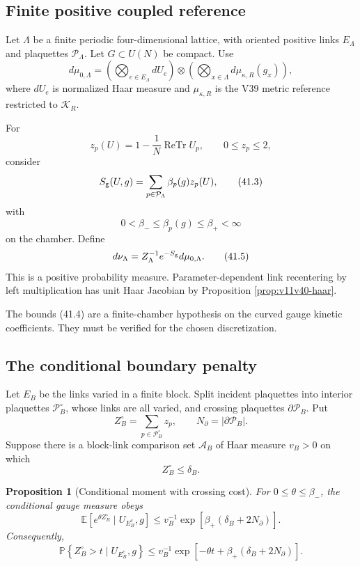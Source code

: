 \documentclass[11pt]{article}
\newtheorem{proposition}[theorem]{Proposition}
\begin{document}
\subsection{Finite positive coupled reference}

Let \(\Lambda\) be a finite periodic four-dimensional lattice, with
oriented positive links \(E_\Lambda\) and plaquettes
\(\mathcal P_\Lambda\).  Let \(G\subset U(N)\) be compact.  Use
\[
 d\mu_{0,\Lambda}
 =
 \left(\bigotimes_{e\in E_\Lambda}dU_e\right)
 \otimes
 \left(\bigotimes_{x\in\Lambda}d\mu_{\kappa,R}(g_x)\right),
 \tag{41.1}
\]
where \(dU_e\) is normalized Haar measure and
\(\mu_{\kappa,R}\) is the V39 metric reference restricted to
\(\mathcal K_R\).

For
\[
 z_p(U)=1-\frac1N\operatorname{ReTr}U_p,
 \qquad 0\leq z_p\leq2,
 \tag{41.2}
\]
consider
\[
 S_{\rm g}(U,g)
 =
 \sum_{p\in\mathcal P_\Lambda}\beta_p(g)z_p(U),
 \tag{41.3}
\]
with
\[
 0<\beta_-\leq\beta_p(g)\leq\beta_+<\infty
 \tag{41.4}
\]
on the chamber.  Define
\[
 d\nu_\Lambda
 =
 Z_\Lambda^{-1}e^{-S_{\rm g}}d\mu_{0,\Lambda}.
 \tag{41.5}
\]
This is a positive probability measure.  Parameter-dependent link
recentering by left multiplication has unit Haar Jacobian by
Proposition \ref{prop:v11v40-haar}.

The bounds (41.4) are a finite-chamber hypothesis on the curved gauge
kinetic coefficients.  They must be verified for the chosen
discretization.

\subsection{The conditional boundary penalty}

Let \(E_B\) be the links varied in a finite block.  Split incident
plaquettes into interior plaquettes \(\mathcal P_B^\circ\), whose links
are all varied, and crossing plaquettes
\(\partial\mathcal P_B\).  Put
\[
 Z_B^\circ=\sum_{p\in\mathcal P_B^\circ}z_p,
 \qquad
 N_\partial=|\partial\mathcal P_B|.
 \tag{41.6}
\]
Suppose there is a block-link comparison set \(\mathcal A_B\) of Haar
measure \(v_B>0\) on which
\[
 Z_B^\circ\leq\delta_B.
 \tag{41.7}
\]

\begin{proposition}[Conditional moment with crossing cost]
\label{prop:v11v41-crossing}
For \(0\leq\theta\leq\beta_-\), the conditional gauge measure obeys
\[
 \mathbb E\left[
 e^{\theta Z_B^\circ}\mid U_{E_B^c},g
 \right]
 \leq
 v_B^{-1}
 \exp\left[
 \beta_+(\delta_B+2N_\partial)
 \right].
 \tag{41.8}
\]
Consequently,
\[
 \mathbb P\left\{
 Z_B^\circ>t\mid U_{E_B^c},g
 \right\}
 \leq
 v_B^{-1}
 \exp\left[
 -\theta t+\beta_+(\delta_B+2N_\partial)
 \right].
 \tag{41.9}
\]
\end{proposition}
\end{document}

